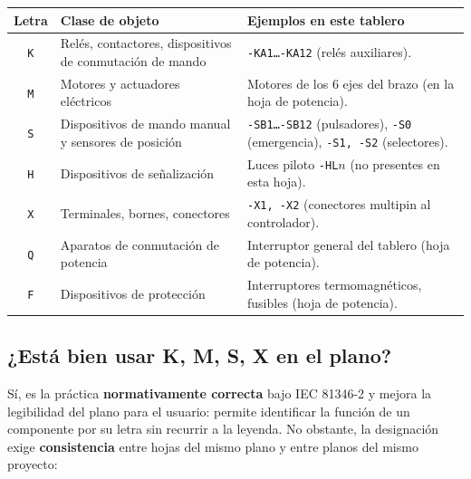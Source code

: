 \documentclass[11pt]{article}
\begin{document}
\begin{center}
	\small
	\begin{tabularx}{\linewidth}{@{}c l X@{}}
		\toprule
		\textbf{Letra} & \textbf{Clase de objeto} & \textbf{Ejemplos en este tablero} \\
		\midrule
		\texttt{K} & Relés, contactores, dispositivos de conmutación de mando & \texttt{-KA1\dots-KA12} (relés auxiliares).\\
		\texttt{M} & Motores y actuadores eléctricos                          & Motores de los 6 ejes del brazo (en la hoja de potencia).\\
		\texttt{S} & Dispositivos de mando manual y sensores de posición      & \texttt{-SB1\dots-SB12} (pulsadores), \texttt{-S0} (emergencia), \texttt{-S1, -S2} (selectores).\\
		\texttt{H} & Dispositivos de señalización                              & Luces piloto \texttt{-HL$n$} (no presentes en esta hoja).\\
		\texttt{X} & Terminales, bornes, conectores                            & \texttt{-X1, -X2} (conectores multipin al controlador).\\
		\texttt{Q} & Aparatos de conmutación de potencia                       & Interruptor general del tablero (hoja de potencia).\\
		\texttt{F} & Dispositivos de protección                                & Interruptores termomagnéticos, fusibles (hoja de potencia).\\
		\bottomrule
	\end{tabularx}
\end{center}

\subsection*{¿Está bien usar K, M, S, X en el plano?}

Sí, es la práctica \textbf{normativamente correcta} bajo IEC 81346-2 y
mejora la legibilidad del plano para el usuario: permite identificar
la función de un componente por su letra sin recurrir a la leyenda.
No obstante, la designación exige \textbf{consistencia} entre hojas
del mismo plano y entre planos del mismo proyecto:
\end{document}

